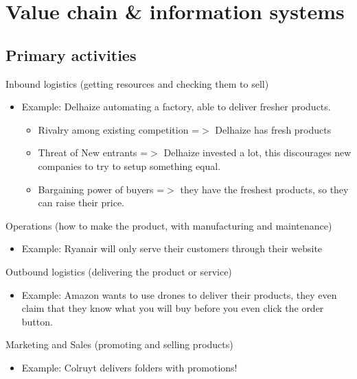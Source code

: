 \documentclass{article}
\begin{document}
\section {Value chain \& information systems}

\subsection{Primary activities}

Inbound logistics (getting resources and checking them to sell)

\begin{itemize}
\item  Example: Delhaize automating a factory, able to deliver fresher products.

\begin{itemize}
\item  Rivalry among existing competition =$>$ Delhaize has fresh products

\item  Threat of New entrants =$>$ Delhaize invested a lot, this discourages new companies to try to setup something equal.

\item  Bargaining power of buyers =$>$ they have the freshest products, so they can raise their price.
\end{itemize}
\end{itemize}

Operations (how to make the product, with manufacturing and maintenance)

\begin{itemize}
\item  Example: Ryanair will only serve their customers through their website
\end{itemize}

Outbound logistics (delivering the product or service)

\begin{itemize}
\item  Example: Amazon wants to use drones to deliver their products, they even claim that they know what you will buy before you even click the order button.
\end{itemize}

Marketing and Sales (promoting and selling products)

\begin{itemize}
\item  Example: Colruyt delivers  folders with promotions!
\end{itemize}
\end{document}
